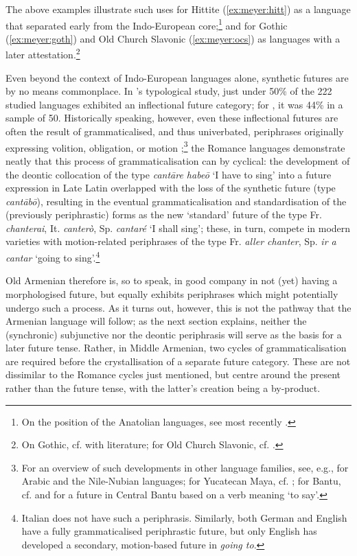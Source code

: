 \documentclass[output=paper,colorlinks,citecolor=brown]{langscibook}
\begin{document}
	The above examples illustrate such uses for Hittite (\ref{ex:meyer:hitt}) as a language that separated early from the Indo-European core;\footnote{On the position of the Anatolian languages, see most recently \citep{Kloekhorst2022}.} and for Gothic (\ref{ex:meyer:goth}) and Old Church Slavonic (\ref{ex:meyer:ocs}) as languages with a later attestation.\footnote{On Gothic, cf. \citet[176 n. 1]{Miller2019} with literature; for Old Church Slavonic, cf. \citet[154–155]{Lunt2001}.}
	
	Even beyond the context of Indo-European languages alone, synthetic futures are by no means commonplace. In \textcite{DahlVelupillai2013}'s typological study, just under 50\% of the 222 studied languages exhibited an inflectional future category; for \citet[156]{Bybee1985}, it was 44\% in a sample of 50. Historically speaking, however, even these inflectional futures are often the result of grammaticalised, and thus univerbated, periphrases originally expressing volition, obligation, or motion \citep[159]{BybeePerkinsPagliuca1994};\footnote{For an overview of such developments in other language families, see, e.g., \citet{AbdelHafiz2017} for Arabic and the Nile-Nubian languages; for Yucatecan Maya, cf. \citet[213–229]{Lehmann2017}; 
	for Bantu, cf. \citet{Batibo2005} 
	and \citet{Botne1998} for a future in Central Bantu based on a verb meaning ‘to say’.} the Romance languages demonstrate neatly that this process of grammaticalisation can by cyclical: the development of the deontic collocation of the type \textit{cantāre habeō} ‘I have to sing’ into a future expression in Late Latin overlapped with the loss of the synthetic future (type \textit{cantābō}), resulting in the eventual grammaticalisation and standardisation of the (previously periphrastic) forms as the new ‘standard’ future of the type Fr. \textit{chanterai}, It. \textit{canterò}, Sp. \textit{cantaré} ‘I shall sing’; these, in turn, compete in modern varieties with motion-related periphrases of the type Fr. \textit{aller chanter}, Sp. \textit{ir a cantar} ‘going to sing’.\footnote{Italian does not have such a periphrasis. Similarly, both German and English have a fully grammaticalised periphrastic future, but only English has developed a secondary, motion-based future in \textit{going to}.}
	
	Old Armenian therefore is, so to speak, in good company in not (yet) having a morphologised future, but equally exhibits periphrases which might potentially undergo such a process. As it turns out, however, this is not the pathway that the Armenian language will follow; as the next section explains, neither the (synchronic) subjunctive nor the deontic periphrasis will serve as the basis for a later future tense. Rather, in Middle Armenian, two cycles of grammaticalisation are required before the crystallisation of a separate future category. These are not dissimilar to the Romance cycles just mentioned, but centre around the present rather than the future tense, with the latter's creation being a by-product.
	
\end{document}
